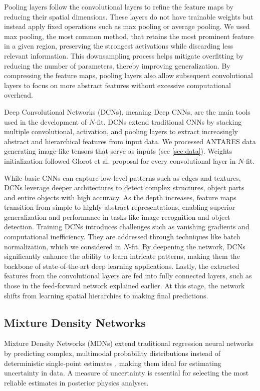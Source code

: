 Pooling layers follow the convolutional layers to refine the feature maps by reducing their spatial dimensions. These layers do not have trainable weights but instead apply fixed operations such as max pooling or average pooling. We used max pooling, the most common method, that retains the most prominent feature in a given region, preserving the strongest activations while discarding less relevant information. This downsampling process helps mitigate overfitting by reducing the number of parameters, thereby improving generalization. By compressing the feature maps, pooling layers also allow subsequent convolutional layers to focus on more abstract features without excessive computational overhead.

Deep Convolutional Networks (DCNs), meaning Deep CNNs, are the main tools used in the development of $N$-fit. DCNs extend traditional CNNs by stacking multiple convolutional, activation, and pooling layers to extract increasingly abstract and hierarchical features from input data. We processed ANTARES data generating image-like tensors that serve as inputs (see \autoref{sec:data}). Weights initialization followed Glorot et al. proposal \cite{Glorot} for every convolutional layer in $N$-fit. 

While basic CNNs can capture low-level patterns such as edges and textures, DCNs leverage deeper architectures to detect complex structures, object parts and entire objects with high accuracy. As the depth increases, feature maps transition from simple to highly abstract representations, enabling superior generalization and performance in tasks like image recognition and object detection. Training DCNs introduces challenges such as vanishing gradients and computational inefficiency. They are addressed through techniques like batch normalization, which we considered in $N$-fit. By deepening the network, DCNs significantly enhance the ability to learn intricate patterns, making them the backbone of state-of-the-art deep learning applications. Lastly, the extracted features from the convolutional layers are fed into fully connected layers, such as those in the feed-forward network explained earlier. At this stage, the network shifts from learning spatial hierarchies to making final predictions. 

\subsection{Mixture Density Networks}
\label{subsec:MDN}

Mixture Density Networks (MDNs) extend traditional regression neural networks by predicting complex, multimodal probability distributions instead of deterministic single-point estimates \cite{MDN}, making them ideal for estimating uncertainty in data. A measure of uncertainty is essential for selecting the most reliable estimates in posterior physics analyses.

